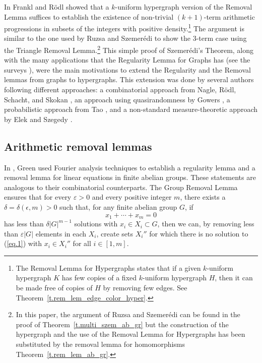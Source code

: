 \documentclass[10pt]{article}
\begin{document}
	In \cite{frarod02} Frankl and R\"odl showed that a $k$-uniform hypergraph version of the Removal Lemma suffices to establish the existence of non-trivial $(k+1)$-term arithmetic progressions in subsets of the integers with positive density.\footnote{The Removal Lemma for Hypergraphs states that if a given $k$-uniform hypergraph $K$ has few copies of a fixed $k$-uniform hypergraph $H$, then it can be made free of copies of $H$ by removing few edges. See Theorem~\ref{t.rem_lem_edge_color_hyper}.} The argument is similar to the one used by Ruzsa and Szemer\'edi \cite{ruzsze78} to show the $3$-term case using the Triangle Removal Lemma.\footnote{In this paper, the argument of Ruzsa and Szemer\'edi can be found in the proof of Theorem~\ref{t.multi_szem_ab_gr} but the construction of the hypergraph and the use of the Removal Lemma for Hypergraphs
has been substituted by the removal lemma for homomorphisms 
Theorem~\ref{t.rem_lem_ab_gr}.} This simple proof of Szemer\'edi's Theorem, 
along with the many applications that the Regularity Lemma for Graphs has (see
the surveys 
\cite{komsim96,komshosimsze02}), were the main motivations to extend the 
Regularity and the Removal lemmas from graphs to hypergraphs. This extension was 
done by several authors following different approaches: a combinatorial approach 
from Nagle, R\"odl, Schacht, and Skokan \cite{nagrodsch06,rodsko04}, an approach
using quasirandomness by Gowers \cite{gow07}, a probabilistic approach from Tao \cite{tao06}, and a non-standard measure-theoretic approach by Elek and Szegedy \cite{elesze12}.

	



\subsection{Arithmetic removal lemmas}

In \cite{gre05}, Green used Fourier analysis techniques to establish a regularity lemma and a removal lemma for linear equations in finite abelian groups. These statements are analogous to their combinatorial counterparts. The Group Removal Lemma \cite[Theorem~1.5]{gre05} ensures that for every $\varepsilon>0$ and every positive integer $m$, there exists a $\delta=\delta(\epsilon,m)>0$ such that, for any finite abelian group $G$, if
\begin{equation} \label{eq.1}
	x_1+\cdots+x_m=0
\end{equation} 
has less than $\delta |G|^{m-1}$ solutions with $x_i\in X_i\subset G$, then we can, by removing less than $\varepsilon |G|$ elements in each $X_i$, create sets $X_i''$ for which there is no solution to (\ref{eq.1}) with $x_i\in X_i''$ for all $i\in[1,m]$. 
\end{document}

